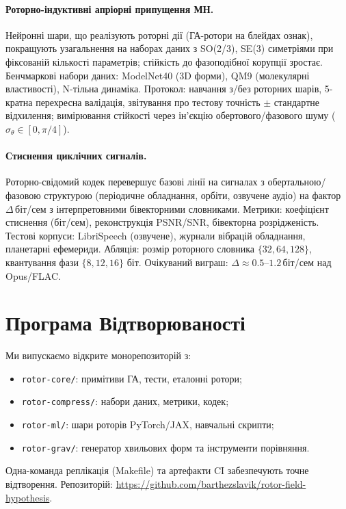 \documentclass[11pt,a4paper]{article}
\theoremstyle{definition}
\theoremstyle{plain}
\theoremstyle{remark}
\begin{document}
\paragraph{Роторно-індуктивні апріорні припущення МН.}
Нейронні шари, що реалізують роторні дії (ГА-ротори на блейдах ознак), покращують узагальнення на наборах даних з SO(2/3), SE(3) симетріями при фіксованій кількості параметрів; стійкість до фазоподібної корупції зростає. Бенчмаркові набори даних: ModelNet40 (3D форми), QM9 (молекулярні властивості), N-тільна динаміка. Протокол: навчання з/без роторних шарів, 5-кратна перехресна валідація, звітування про тестову точність $\pm$ стандартне відхилення; вимірювання стійкості через ін'єкцію обертового/фазового шуму ($\sigma_\theta \in [0, \pi/4]$).

\paragraph{Стиснення циклічних сигналів.}
Роторно-свідомий кодек перевершує базові лінії на сигналах з обертальною/фазовою структурою (періодичне обладнання, орбіти, озвучене аудіо) на фактор $\Delta$\,біт/сем з інтерпретовними бівекторними словниками. Метрики: коефіцієнт стиснення (біт/сем), реконструкція PSNR/SNR, бівекторна розрідженість. Тестові корпуси: LibriSpeech (озвучене), журнали вібрацій обладнання, планетарні ефемериди. Абляція: розмір роторного словника $\{32, 64, 128\}$, квантування фази $\{8, 12, 16\}$ біт. Очікуваний виграш: $\Delta \approx 0.5$--$1.2$\,біт/сем над Opus/FLAC.

\vspace{1em}

\section{Програма Відтворюваності}
Ми випускаємо відкрите монорепозиторій з:
\begin{itemize}[leftmargin=*,itemsep=2pt]
  \item \texttt{rotor-core/}: примітиви ГА, тести, еталонні ротори;
  \item \texttt{rotor-compress/}: набори даних, метрики, кодек;
  \item \texttt{rotor-ml/}: шари роторів PyTorch/JAX, навчальні скрипти;
  \item \texttt{rotor-grav/}: генератор хвильових форм та інструменти порівняння.
\end{itemize}
Одна-команда реплікація (Makefile) та артефакти CI забезпечують точне відтворення. Репозиторій: \url{https://github.com/barthezslavik/rotor-field-hypothesis}.
\end{document}
